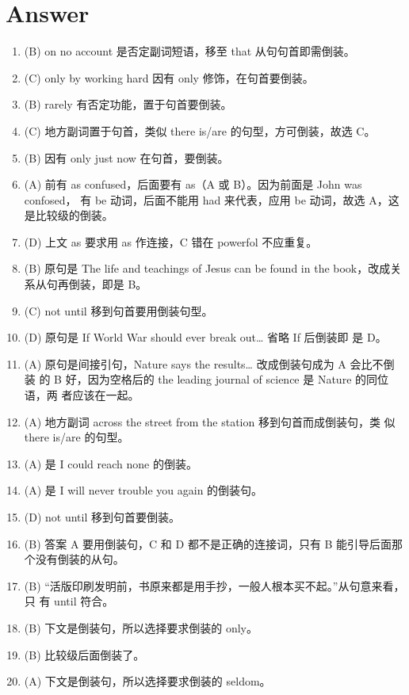 \section{Answer}
\begin{enumerate}
\item (B) on no account 是否定副词短语，移至 that 从句句首即需倒装。

\item (C) only by working hard 因有 only 修饰，在句首要倒装。

\item (B) rarely 有否定功能，置于句首要倒装。

\item (C) 地方副词置于句首，类似 there is/are 的句型，方可倒装，故选 C。

\item (B) 因有 only just now 在句首，要倒装。

\item (A) 前有 as confused，后面要有 as（A 或 B）。因为前面是 John was confosed，
  有 be 动词，后面不能用 had 来代表，应用 be 动词，故选 A，这是比较级的倒装。

\item (D) 上文 as 要求用 as 作连接，C 错在 powerfol 不应重复。

\item (B) 原句是 The life and teachings of Jesus can be found in the book，改成关系从句再倒装，即是 B。


\item (C) not until 移到句首要用倒装句型。
\item (D) 原句是 If World War  should ever break out… 省略 If 后倒装即
  是 D。

\item (A) 原句是间接引句，Nature says the results… 改成倒装句成为 A 会比不倒装
  的 B 好，因为空格后的 the leading journal of science 是 Nature 的同位语，两
  者应该在一起。

\item (A) 地方副词 across the street from the station 移到句首而成倒装句，类
  似 there is/are 的句型。

\item (A) 是 I could reach none 的倒装。

\item (A) 是 I will never trouble you again 的倒装句。

\item (D) not until 移到句首要倒装。

\item (B) 答案 A 要用倒装句，C 和 D 都不是正确的连接词，只有 B 能引导后面那个没有倒装的从句。

\item (B) “活版印刷发明前，书原来都是用手抄，一般人根本买不起。”从句意来看，只
  有 until 符合。

\item (B) 下文是倒装句，所以选择要求倒装的 only。

\item (B) 比较级后面倒装了。

\item (A) 下文是倒装句，所以选择要求倒装的 seldom。
\end{enumerate}

